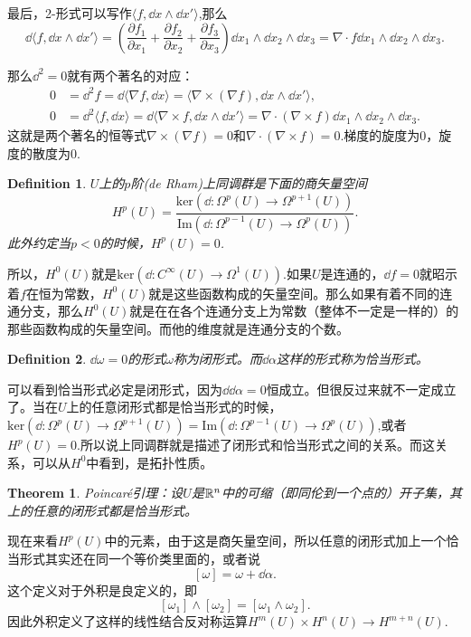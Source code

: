 \documentclass[11pt]{extbook}
\theoremstyle{plain}%
\newtheorem{theo}{Theorem}[section]%
\newtheorem{defi}{Definition}[section]%
\begin{document}
最后，2-形式可以写作$\langle f, \dd x \wedge \dd x'  \rangle$,那么
\[
\dd \langle f, \dd x \wedge \dd x'  \rangle=\left(\frac{\partial f_1}{\partial x_1}+\frac{\partial f_2}{\partial x_2}+\frac{\partial f_3}{\partial x_3}\right)\dd x_1 \wedge \dd x_2\wedge \dd x_3=\nabla\cdot f \dd x_1 \wedge \dd x_2\wedge \dd x_3.
\]

那么$\dd^2=0$就有两个著名的对应：
\[
\begin{split}
0&=\dd^2 f =\dd \langle \nabla f, \dd x \rangle = \langle \nabla\times (\nabla f),\dd x \wedge \dd x'  \rangle,\\
0&=\dd^2 \langle f, \dd x \rangle=\dd \langle \nabla\times  f,\dd x \wedge \dd x'  \rangle = \nabla\cdot( \nabla\times  f )\dd x_1 \wedge \dd x_2\wedge \dd x_3.
\end{split}
\]
这就是两个著名的恒等式$\nabla\times (\nabla f)=0$和$\nabla\cdot( \nabla\times  f )=0$.梯度的旋度为0，旋度的散度为0.

\begin{defi}
$U$上的$p$阶(de Rham)上同调群是下面的商矢量空间
\[
H^p(U)=\frac{\mathrm{ker}\left(\dd:\Omega^p(U)\to\Omega^{p+1}(U)\right)}{\mathrm{Im}\left(\dd:\Omega^{p-1}(U)\to\Omega^{p}(U)\right)}.
\]
此外约定当$p<0$的时候，$H^p(U)=0$.
\end{defi}
所以，$H^0(U)$就是$\mathrm{ker}\left(\dd:C^\infty(U)\to\Omega^1(U)\right)$.如果$U$是连通的，$\dd f=0$就昭示着$f$在恒为常数，$H^0(U)$就是这些函数构成的矢量空间。那么如果有着不同的连通分支，那么$H^0(U)$就是在在各个连通分支上为常数（整体不一定是一样的）的那些函数构成的矢量空间。而他的维度就是连通分支的个数。

\begin{defi}
$\dd \omega=0$的形式$\omega$称为闭形式。而$\dd \alpha$这样的形式称为恰当形式。
\end{defi}
可以看到恰当形式必定是闭形式，因为$\dd \dd \alpha=0$恒成立。但很反过来就不一定成立了。当在$U$上的任意闭形式都是恰当形式的时候，$\mathrm{ker}\left(\dd:\Omega^p(U)\to\Omega^{p+1}(U)\right)=\mathrm{Im}\left(\dd:\Omega^{p-1}(U)\to\Omega^{p}(U)\right)$,或者$H^p(U)=0$.所以说上同调群就是描述了闭形式和恰当形式之间的关系。而这关系，可以从$H^0$中看到，是拓扑性质。
\begin{theo}
Poincaré引理：设$U$是$\mathbb{R}^n$中的可缩（即同伦到一个点的）开子集，其上的任意的闭形式都是恰当形式。
\end{theo}

现在来看$H^p(U)$中的元素，由于这是商矢量空间，所以任意的闭形式加上一个恰当形式其实还在同一个等价类里面的，或者说
\[
[\omega]=\omega+\dd\alpha.
\]
这个定义对于外积是良定义的，即
\[
[\omega_1]\wedge[\omega_2]=[\omega_1\wedge\omega_2].
\]
因此外积定义了这样的线性结合反对称运算$H^{m}(U)\times H^{n}(U)\to H^{m+n}(U)$.
\end{document}
